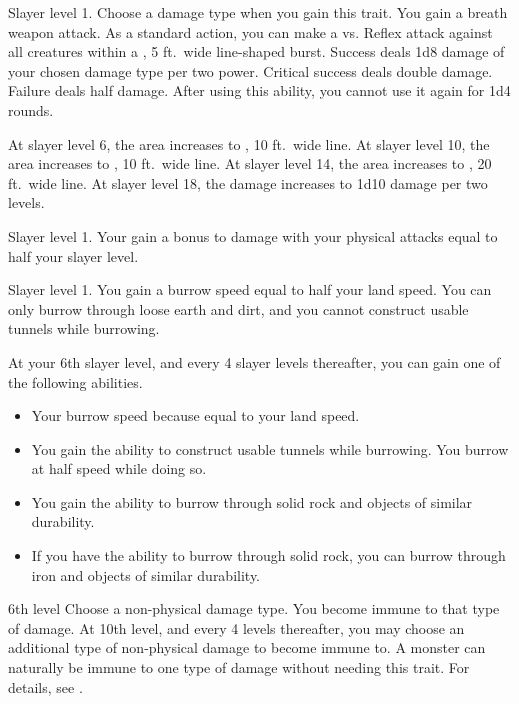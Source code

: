     \featpre Slayer level 1.
     Choose a damage type when you gain this trait.
    \featben You gain a breath weapon attack.
    As a standard action, you can make a  vs. Reflex attack against all creatures within a \arealarge, 5 ft.\ wide line-shaped burst.
    Success deals 1d8 damage of your chosen damage type per two power.
    Critical success deals double damage.
    Failure deals half damage.
    After using this ability, you cannot use it again for 1d4 rounds.

    At slayer level 6, the area increases to \arealarge, 10 ft.\ wide line.
    At slayer level 10, the area increases to \areahuge, 10 ft.\ wide line.
    At slayer level 14, the area increases to \areahuge, 20 ft.\ wide line.
    At slayer level 18, the damage increases to 1d10 damage per two levels.

    \featpre Slayer level 1.
    \featben Your gain a bonus to damage with your physical attacks equal to half your slayer level.

    \featpre Slayer level 1.
    \featben You gain a burrow speed equal to half your land speed.
    You can only burrow through loose earth and dirt, and you cannot construct usable tunnels while burrowing.

    At your 6th slayer level, and every 4 slayer levels thereafter, you can gain one of the following abilities.
    \begin{itemize}
        \item Your burrow speed because equal to your land speed.
        \item You gain the ability to construct usable tunnels while burrowing.
            You burrow at half speed while doing so.
        \item You gain the ability to burrow through solid rock and objects of similar durability.
        \item If you have the ability to burrow through solid rock, you can burrow through iron and objects of similar durability.
    \end{itemize}

    \featpre 6th level
    \featben Choose a non-physical damage type.
    You become immune to that type of damage.
    At 10th level, and every 4 levels thereafter, you may choose an additional type of non-physical damage to become immune to.
     A monster can naturally be immune to one type of damage without needing this trait.
    For details, see .

